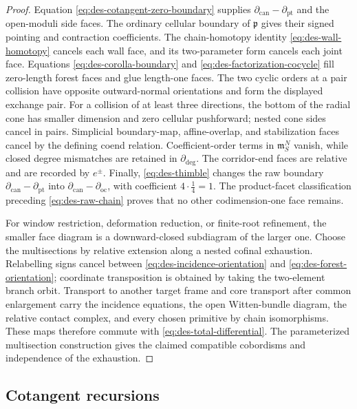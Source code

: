 \begin{proof}
Equation \eqref{eq:des-cotangent-zero-boundary} supplies
$\partial_{\mathrm{can}}-\partial_{\mathrm{pt}}$ and the open-moduli side
faces.  The ordinary cellular boundary of $\mathfrak p$ gives their signed
pointing and contraction coefficients.  The chain-homotopy identity
\eqref{eq:des-wall-homotopy} cancels each wall
face, and its two-parameter form cancels each joint face.  Equations
\eqref{eq:des-corolla-boundary} and
\eqref{eq:des-factorization-cocycle} fill zero-length forest faces and glue
length-one faces.  The two cyclic orders at a pair collision have opposite
outward-normal orientations and form the displayed exchange pair.  For a collision
of at least three directions, the bottom of the radial cone has smaller
dimension and zero cellular pushforward; nested cone sides cancel in pairs.
Simplicial boundary-map, affine-overlap, and stabilization faces cancel by the defining
coend relation.  Coefficient-order terms in $\mathfrak m_S^N$ vanish, while
closed degree mismatches are retained in $\partial_{\mathrm{deg}}$.  The
corridor-end faces are relative and are recorded by $e^\pm$.  Finally,
\eqref{eq:des-thimble} changes the raw boundary
$\partial_{\mathrm{can}}-\partial_{\mathrm{pt}}$ into
$\partial_{\mathrm{can}}-\partial_{\mathrm{oc}}$, with coefficient
$4\cdot\frac14=1$.  The product-facet classification preceding
\eqref{eq:des-raw-chain} proves that no other codimension-one face remains.

For window restriction, deformation reduction, or finite-root refinement,
the smaller face diagram is a downward-closed subdiagram of the larger one.
Choose the multisections by relative extension along a nested cofinal
exhaustion.  Relabelling signs cancel between
\eqref{eq:des-incidence-orientation} and
\eqref{eq:des-forest-orientation}; coordinate transposition is obtained by
taking the two-element branch orbit.  Transport to another target frame and
core transport after common enlargement carry the incidence equations, the
open Witten-bundle diagram, the relative contact complex, and every chosen primitive by
chain isomorphisms.  These maps therefore
commute with \eqref{eq:des-total-differential}.  The parameterized
multisection construction gives the claimed compatible cobordisms and
independence of the exhaustion.
\end{proof}

\subsection{Cotangent recursions}

